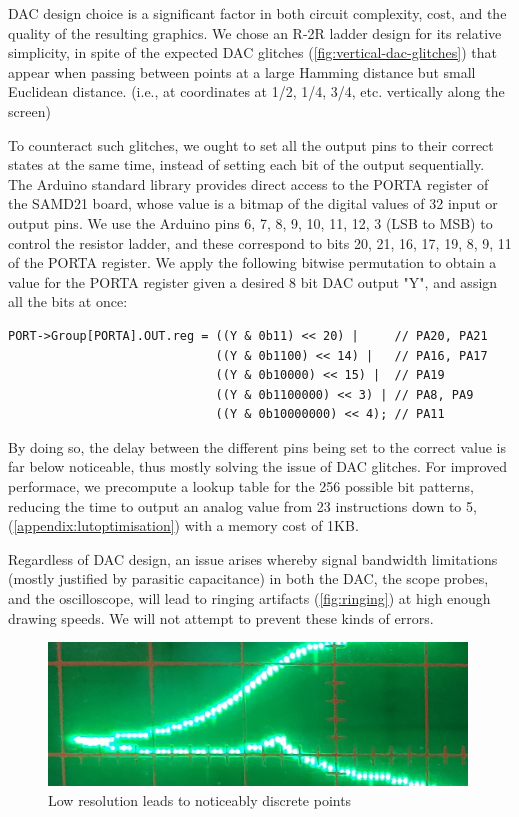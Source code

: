 \documentclass[12pt]{article}
\begin{document}
DAC design choice is a significant factor in both circuit complexity, cost, and the quality of the resulting graphics. We chose an R-2R ladder design for its relative simplicity, in spite of the expected DAC glitches (\autoref{fig:vertical-dac-glitches}) that appear when passing between points at a large Hamming distance but small Euclidean distance. (i.e., at coordinates at 1/2, 1/4, 3/4, etc. vertically along the screen)

To counteract such glitches, we ought to set all the output pins to their correct states at the same time, instead of setting each bit of the output sequentially. The Arduino standard library provides direct access to the PORTA register of the SAMD21 board, whose value is a bitmap of the digital values of 32 input or output pins. We use the Arduino pins 6, 7, 8, 9, 10, 11, 12, 3 (LSB to MSB) to control the resistor ladder, and these correspond to bits 20, 21, 16, 17, 19, 8, 9, 11 of the PORTA register. We apply the following bitwise permutation to obtain a value for the PORTA register given a desired 8 bit DAC output "Y", and assign all the bits at once:

\begin{lstlisting}
PORT->Group[PORTA].OUT.reg = ((Y & 0b11) << 20) |     // PA20, PA21
                             ((Y & 0b1100) << 14) |   // PA16, PA17
                             ((Y & 0b10000) << 15) |  // PA19
                             ((Y & 0b1100000) << 3) | // PA8, PA9
                             ((Y & 0b10000000) << 4); // PA11         
\end{lstlisting}
\noindent By doing so, the delay between the different pins being set to the correct value is far below noticeable, thus mostly solving the issue of DAC glitches. For improved performace, we precompute a lookup table for the 256 possible bit patterns, reducing the time to output an analog value from 23 instructions down to 5, (\autoref{appendix:lutoptimisation}) with a memory cost of 1KB.

Regardless of DAC design, an issue arises whereby signal bandwidth limitations (mostly justified by parasitic capacitance) in both the DAC, the scope probes, and the oscilloscope, will lead to ringing artifacts (\autoref{fig:ringing}) at high enough drawing speeds. We will not attempt to prevent these kinds of errors.

\begin{figure}[p]
\centering
\includegraphics[width=0.99\textwidth]{images/low-resolution.png}
\caption{Low resolution leads to noticeably discrete points}
\label{fig:low-resolution}
\end{figure}
\end{document}
